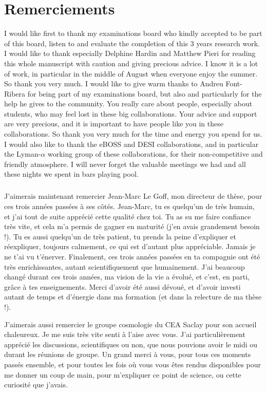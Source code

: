 \chapter*{Remerciements}
\thispagestyle{plain}


I would like first to thank my examinations board who kindly accepted to be part of this board, listen to and evaluate the completion of this 3 years research work.
I would like to thank especially Delphine Hardin and Matthew Pieri for reading this whole manuscript with caution and giving precious advice. I know it is a lot of work, in particular in the middle of August when everyone enjoy the summer. So thank you very much.
I would like to give warm thanks to Andreu Font-Ribera for being part of my examinations board, but also and particularly for the help he gives to the community. You really care about people, especially about students, who may feel lost in these big collaborations. Your advice and support are very precious, and it is important to have people like you in these collaborations. So thank you very much for the time and energy you spend for us.
I would also like to thank the eBOSS and DESI collaborations, and in particular the Lyman-$\alpha$ working group of these collaborations, for their non-competitive and friendly atmosphere. I will never forget the valuable meetings we had and all these nights we spent in bars playing pool.

\paragraph{}
J'aimerais maintenant remercier Jean-Marc Le Goff, mon directeur de thèse, pour ces trois années passées à ses côtés. Jean-Marc, tu es quelqu'un de très humain, et j'ai tout de suite apprécié cette qualité chez toi. Tu as su me faire confiance très vite, et cela m'a permis de gagner en maturité (j'en avais grandement besoin !). Tu es aussi quelqu'un de très patient, tu prends la peine d'expliquer et réexpliquer, toujours calmement, ce qui est d'autant plus appréciable. Jamais je ne t'ai vu t'énerver. Finalement, ces trois années passées en ta compagnie ont été très enrichissantes, autant scientifiquement que humainement. J'ai beaucoup changé durant ces trois années, ma vision de la vie a évolué, et c'est, en parti, grâce à tes enseignements. Merci d'avoir été aussi dévoué, et d'avoir investi autant de temps et d'énergie dans ma formation (et dans la relecture de ma thèse !).

J'aimerais aussi remercier le groupe cosmologie du CEA Saclay pour son accueil chaleureux. Je me suis très vite senti à l'aise avec vous. J'ai particulièrement apprécié les discussions, scientifiques ou non, que nous pouvions avoir le midi ou durant les réunions de groupe. Un grand merci à vous, pour tous ces moments passés ensemble, et pour toutes les fois où vous vous êtes rendus disponibles pour me donner un coup de main, pour m'expliquer ce point de science, ou cette curiosité que j'avais.

